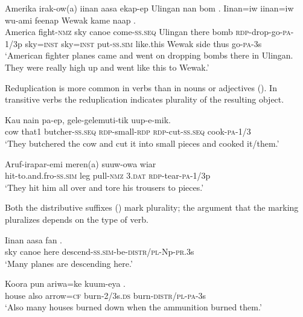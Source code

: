 \ea%
\label{ex:6:x1283}
\gll Amerika  irak-ow(a)  iinan  aasa  ekap-ep  Ulingan  nan  bom .  Iinan=iw  iinan=iw  wu-ami  feenap Wewak  kame  naap  .\\
America  fight-\textsc{nmz}  sky  canoe  come-\textsc{ss}.\textsc{seq}  Ulingan  there  bomb \textsc{rdp}-drop-go-\textsc{pa}-1/3p  sky=\textsc{inst}  sky=\textsc{inst}  put-\textsc{ss}.\textsc{sim}  like.this Wewak  side  thus  go-\textsc{pa}-3s\\
\glt `American fighter planes came and went on dropping bombs there in Ulingan. They were really high up and went like this to Wewak.'
\z

Reduplication is more common in verbs than in nouns or adjectives (). In transitive verbs the reduplication indicates plurality of the resulting object. 

\ea%
\label{ex:6:x1298}
\gll Kau  nain  pa-ep,  gele-gelemuti-tik \textstyleEmphasizedVernacularWords{-}  uup-e-mik.\\
cow  that1  butcher-\textsc{ss}.\textsc{seq}  \textsc{rdp}-small-\textsc{rdp} \textsc{rdp}-cut-\textsc{ss}.\textsc{seq}  cook-\textsc{pa}-1/3\\
\glt `They butchered the cow and cut it into small pieces and cooked it/them.'
\z

\ea%
\label{ex:6:x1297}
\gll Aruf-irapar-emi  meren(a)  suuw-owa  wiar \\
hit-to.and.fro-\textsc{ss}.\textsc{sim}  leg  pull-\textsc{nmz}  3.\textsc{dat} \textsc{rdp}-tear-\textsc{pa}-1/3p\\
\glt `They hit him all over and tore his trousers to pieces.'
\z

Both the distributive suffixes () mark plurality; the argument that the marking pluralizes depends on the type of verb. 

\ea%
\label{ex:6:x1300}
\gll Iinan  aasa  fan  . \\
sky  canoe  here  descend-\textsc{ss}.\textsc{sim}-be-\textsc{distr}/\textsc{pl}-Np-\textsc{pr}.3s\\
\glt `Many planes are descending here.'
\z

\ea%
\label{ex:6:x1299}
\gll Koora  pun  ariwa=ke  kuum-eya  . \\
house  also  arrow=\textsc{cf}  burn-2/3s.\textsc{ds}  burn-\textsc{distr}/\textsc{pl}-\textsc{pa}-3s\\
\glt `Also many houses burned down when the ammunition burned them.'
\z

